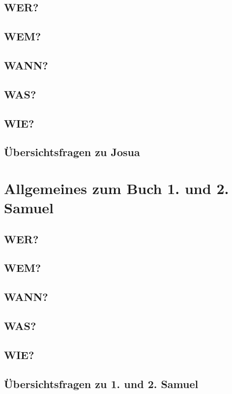 \subsection{WER?}
\subsection{WEM?}
\subsection{WANN?}
\subsection{WAS?}
\subsection{WIE?}
\subsection{Übersichtsfragen zu Josua}
    
\section{Allgemeines zum Buch 1. und 2. Samuel}
\subsection{WER?}
\subsection{WEM?}
\subsection{WANN?}
\subsection{WAS?}
\subsection{WIE?}
\subsection{Übersichtsfragen zu 1. und 2. Samuel}
    

